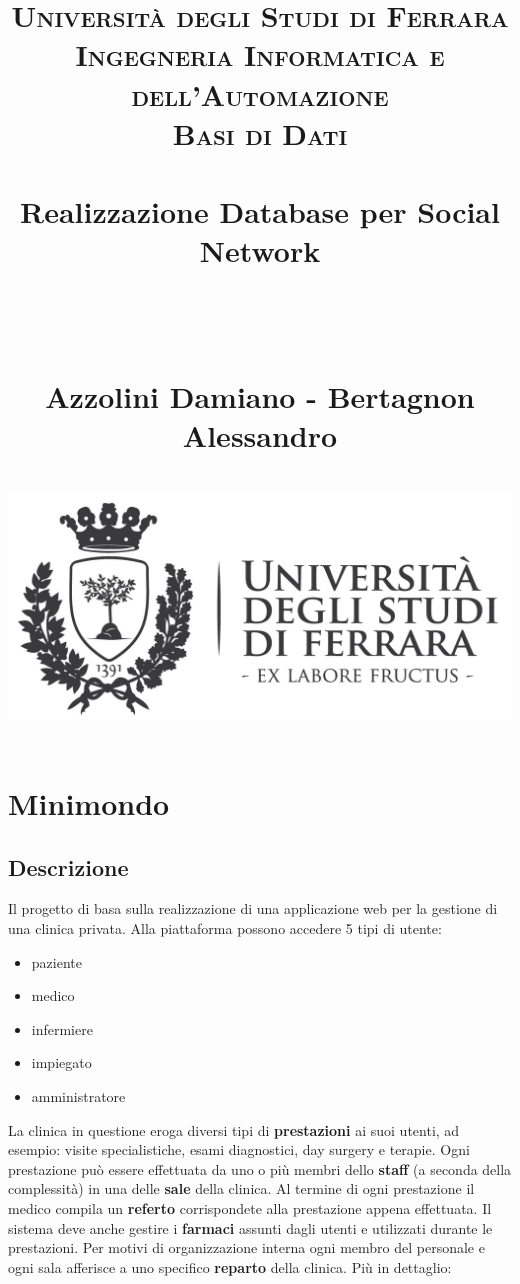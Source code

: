 \documentclass[paper=a4, fontsize=11pt,x11names]{report}
\title{
		\usefont{OT1}{bch}{b}{n}
		\normalfont \normalsize \textsc{Universit\`a degli Studi di Ferrara \\ Ingegneria Informatica e dell'Automazione
			\\ Basi di Dati} \\ [25pt]
		\horrule{0.5pt} \\[0.4cm]
		\Huge Realizzazione Database per Social Network \date{}\\%
		\horrule{0.5pt} \\[0.4cm]
		\LARGE Azzolini Damiano - Bertagnon Alessandro \\ [0.4cm]
		\horrule{2pt} \\[0.8cm]
		\includegraphics{logoUnife}
}
\begin{document}
\maketitle

\newpage

\tableofcontents
\thispagestyle{empty}

\listoffigures
\thispagestyle{empty}


\newpage





\chapter{Minimondo}
\section{Descrizione}
Il progetto di basa sulla realizzazione di una applicazione web per la gestione di una clinica privata. Alla piattaforma possono accedere 5 tipi di utente:
\begin{itemize}
\item paziente
\item medico
\item infermiere
\item impiegato
\item amministratore
\end{itemize}  

La clinica in questione eroga diversi tipi di \textbf{prestazioni} ai suoi utenti, ad esempio: visite specialistiche, esami diagnostici, day surgery e terapie. Ogni prestazione può essere effettuata da uno o più membri dello \textbf{staff} (a seconda della complessità) in una delle \textbf{sale} della clinica. Al termine di ogni prestazione il medico compila un \textbf{referto} corrispondete alla prestazione appena effettuata. Il sistema deve anche gestire i \textbf{farmaci} assunti dagli utenti e utilizzati durante le prestazioni. Per motivi di organizzazione interna ogni membro del personale e ogni sala afferisce a uno specifico \textbf{reparto} della clinica. Più in dettaglio:\\
\end{document}
